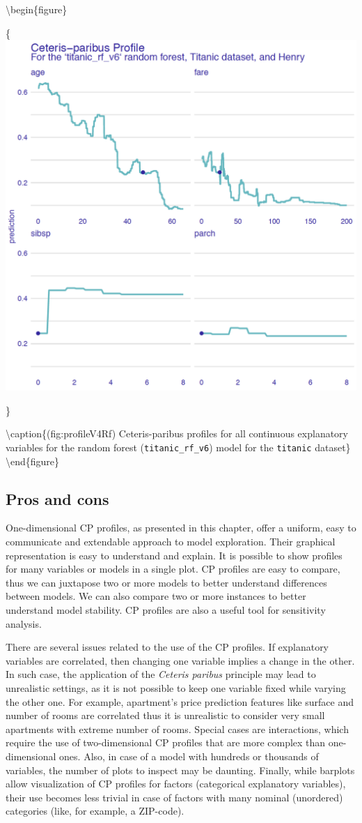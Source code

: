 \documentclass[12pt,]{krantz}
\theoremstyle{definition}
\theoremstyle{definition}
\theoremstyle{definition}
\theoremstyle{remark}
\begin{document}
\textbackslash{}begin\{figure\}

\{\centering \includegraphics[width=0.7\linewidth]{figure/profile_v4_rf3}

\}

\textbackslash{}caption\{(fig:profileV4Rf) Ceteris-paribus profiles for
all continuous explanatory variables for the random forest
(\texttt{titanic\_rf\_v6}) model for the \texttt{titanic}
dataset\}\label{fig:profileV4Rf} \textbackslash{}end\{figure\}

\hypertarget{CPProsCons}{%
\subsection{Pros and cons}\label{CPProsCons}}

One-dimensional CP profiles, as presented in this chapter, offer a
uniform, easy to communicate and extendable approach to model
exploration. Their graphical representation is easy to understand and
explain. It is possible to show profiles for many variables or models in
a single plot. CP profiles are easy to compare, thus we can juxtapose
two or more models to better understand differences between models. We
can also compare two or more instances to better understand model
stability. CP profiles are also a useful tool for sensitivity analysis.

There are several issues related to the use of the CP profiles. If
explanatory variables are correlated, then changing one variable implies
a change in the other. In such case, the application of the
\emph{Ceteris paribus} principle may lead to unrealistic settings, as it
is not possible to keep one variable fixed while varying the other one.
For example, apartment's price prediction features like surface and
number of rooms are correlated thus it is unrealistic to consider very
small apartments with extreme number of rooms. Special cases are
interactions, which require the use of two-dimensional CP profiles that
are more complex than one-dimensional ones. Also, in case of a model
with hundreds or thousands of variables, the number of plots to inspect
may be daunting. Finally, while barplots allow visualization of CP
profiles for factors (categorical explanatory variables), their use
becomes less trivial in case of factors with many nominal (unordered)
categories (like, for example, a ZIP-code).
\end{document}
